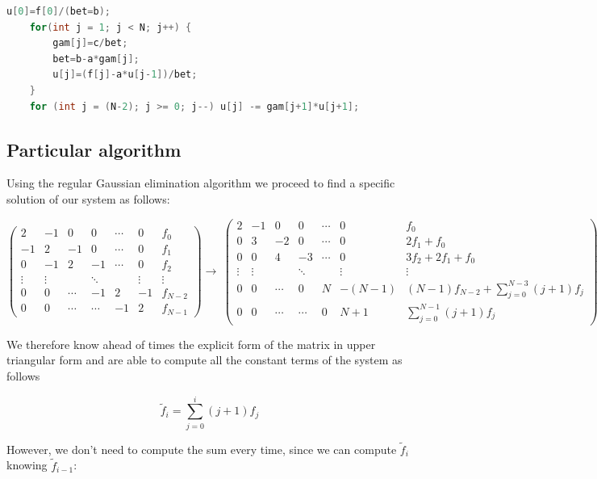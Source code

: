 \documentclass {article}
\begin{document}
\begin{lstlisting}[language=cpp]
	u[0]=f[0]/(bet=b);
    for(int j = 1; j < N; j++) {
        gam[j]=c/bet;
        bet=b-a*gam[j];
        u[j]=(f[j]-a*u[j-1])/bet;
    }
    for (int j = (N-2); j >= 0; j--) u[j] -= gam[j+1]*u[j+1];
\end{lstlisting}

\subsection{Particular algorithm}

Using the regular Gaussian elimination algorithm we proceed to find a specific solution of our system as follows:

\begin{equation}
\left(
\begin{array}{cccccc|c}
   2 & -1 &  0 & 0 & \cdots & 0 & f_0 \\
  -1 &  2 & -1 & 0 & \cdots & 0 & f_1 \\
   0 &-1 &  2 & -1 & \cdots & 0 & f_2\\
  \vdots  & \vdots  & & \ddots & & \vdots & \vdots  \\
   0 &  0 & \cdots  & -1 & 2 & -1 & f_{N-2} \\
   0 &  0 & \cdots & \cdots  & -1 & 2 & f_{N-1} 
\end{array}	
\right)
\longrightarrow\
\left(
\begin{array}{cccccc|c}
   2 & -1 &  0 & 0 & \cdots & 0 & f_0 \\
   0 &  3 & -2 & 0 & \cdots & 0 & 2 f_1+f_0 \\
   0 & 0 &  4 & -3 & \cdots & 0 & 3 f_2+2 f_1+f_0\\
  \vdots  & \vdots  & & \ddots & & \vdots & \vdots  \\
   0 &  0 & \cdots  & 0 & N & -(N-1) &  (N-1) f_{N-2} + \sum_{j=0}^{N-3} (j+1)f_{j}  \\
   0 &  0 & \cdots & \cdots  & 0 & N+1 &  \sum_{j=0}^{N-1} (j+1)f_{j} 
\end{array}	
\right)
\end{equation}

We therefore know ahead of times the explicit form of the matrix in upper triangular form and are able to compute all the constant terms of the system as follows

$$\tilde{f}_i= \sum_{j=0}^{i}(j+1) f_j$$

However, we don't need to compute the sum every time, since we can compute $\tilde{f}_i$ knowing $\tilde{f}_{i-1}$:
\end{document}
